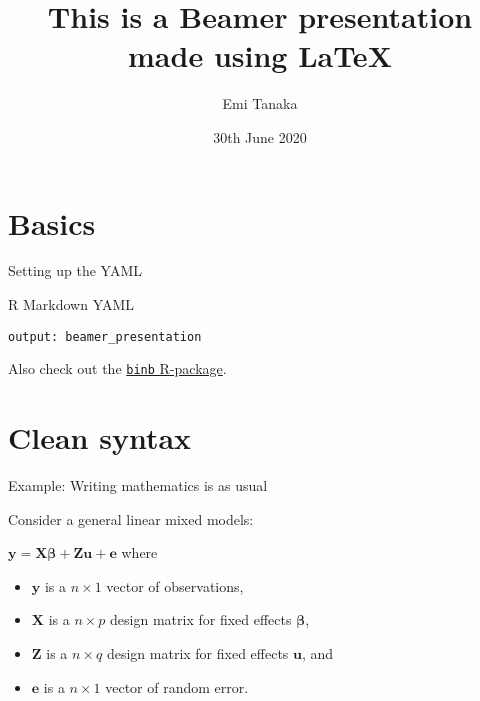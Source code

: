 \documentclass[10pt,aspectratio=169]{beamer}
\title{This is a Beamer presentation made using \LaTeX}
\subtitle{}
\author{Emi Tanaka}
\date{30th June 2020}
\institute{Monash University}
\begin{document}
\frame{\titlepage}

\begin{frame}
  \tableofcontents[hideallsubsections]
\end{frame}

\section{Basics}

\begin{frame}{Setting up the YAML}

\begin{block}{R Markdown YAML}

\texttt{output:\ beamer\_presentation}

\end{block}

Also check out the
\href{https://github.com/eddelbuettel/binb}{\texttt{binb} R-package}.

\end{frame}

\section{Clean syntax}

\begin{frame}{Example: Writing mathematics is as usual}

Consider a general linear mixed models:

$\boldsymbol{y} = \mathbf{X}\boldsymbol{\beta} + \mathbf{Z}\boldsymbol{u} + \boldsymbol{e}$
where

\begin{itemize}
\item
  $\boldsymbol{y}$ is a $n\times 1$ vector of observations,
\item
  $\mathbf{X}$ is a $n\times p$ design matrix for fixed effects
  $\boldsymbol{\beta}$,
\item
  $\mathbf{Z}$ is a $n\times q$ design matrix for fixed effects
  $\boldsymbol{u}$, and
\item
  $\boldsymbol{e}$ is a $n\times 1$ vector of random error.
\end{itemize}

\end{frame}
\end{document}

